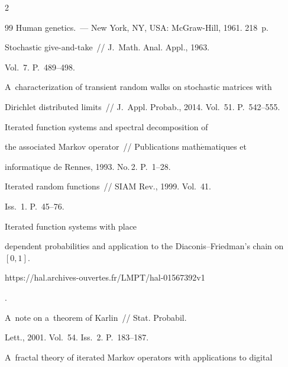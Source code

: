 \begin{multicols}{2}
{{\begin{thebibliography}{99}
   Human genetics.~--- New York, NY, USA: McGraw-Hill, 1961. 218~p.


 




   Stochastic give-and-take~// J.~Math. Anal. Appl., 1963. 


Vol.~7. P.~489--498.







   A~characterization of transient random walks on stochastic matrices with 


Dirichlet distributed limits~// J.~Appl. Probab., 2014. Vol.~51. P.~542--555.







   Iterated function systems and spectral decomposition of 


the associated Markov operator~// Publications math$\acute{\mbox{e}}$matiques et 


informatique de Rennes, 1993. No.\,2. P.~1--28.







   Iterated random functions~// SIAM Rev., 1999. Vol.~41. 


Iss.~1. P.~45--76.




   Iterated function systems with place 


dependent probabilities and application to the Diaconis--Friedman's chain on~$[0,1]$. {\sf 


https://hal.archives-ouvertes.fr/LMPT/hal-01567392v1}.


 




   A~note on a~theorem of Karlin~// Stat. Probabil. 


Lett., 2001. Vol.~54. Iss.~2. P.~183--187.




   A~fractal theory of iterated Markov operators with applications to digital 



\end{thebibliography}}}
\end{multicols}
